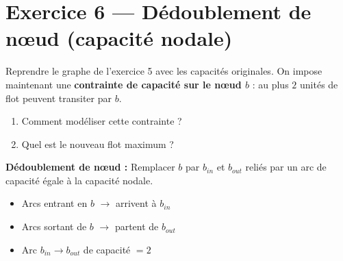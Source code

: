 \documentclass[12pt,a4paper]{article}
\begin{document}
\newpage
\section{Exercice 6 --- D\'edoublement de n\oe ud (capacit\'e nodale)}

\begin{enonce}
Reprendre le graphe de l'exercice 5 avec les capacit\'es originales. On impose maintenant une \textbf{contrainte de capacit\'e sur le n\oe ud $b$} : au plus $2$ unit\'es de flot peuvent transiter par $b$.

\begin{enumerate}
    \item Comment mod\'eliser cette contrainte ?
    \item Quel est le nouveau flot maximum ?
\end{enumerate}
\end{enonce}

\begin{methode}
\textbf{D\'edoublement de n\oe ud :} Remplacer $b$ par $b_{in}$ et $b_{out}$ reli\'es par un arc de capacit\'e \'egale \`a la capacit\'e nodale.
\begin{itemize}[nosep]
    \item Arcs entrant en $b$ $\to$ arrivent \`a $b_{in}$
    \item Arcs sortant de $b$ $\to$ partent de $b_{out}$
    \item Arc $b_{in} \to b_{out}$ de capacit\'e $= 2$
\end{itemize}
\end{methode}
\end{document}
